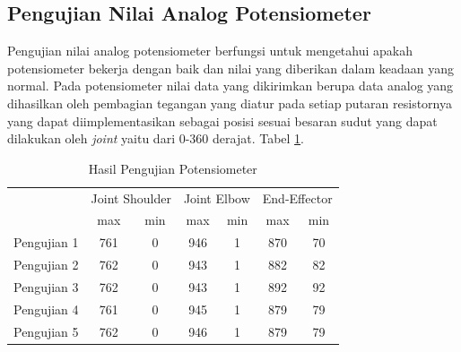 \subsection{Pengujian Nilai Analog Potensiometer}
Pengujian nilai analog potensiometer berfungsi untuk mengetahui apakah potensiometer bekerja dengan baik dan nilai yang diberikan dalam keadaan yang normal. Pada potensiometer nilai data yang dikirimkan berupa data analog yang dihasilkan oleh pembagian tegangan yang diatur pada setiap putaran resistornya yang dapat diimplementasikan sebagai posisi sesuai besaran sudut yang dapat dilakukan oleh \textit{joint} yaitu dari 0-360 derajat. Tabel \ref{tbl.potensiometer}.

\begin{table}[H]
	\centering
	\caption{Hasil Pengujian Potensiometer}
	\label{tbl.potensiometer}
	\begin{tabular}{|c|c|c|c|c|c|c|}
		\hline
		\rowcolor[HTML]{9B9B9B} 
		\cellcolor[HTML]{9B9B9B}                            & \multicolumn{2}{c|}{\cellcolor[HTML]{9B9B9B}Joint Shoulder} & \multicolumn{2}{c|}{\cellcolor[HTML]{9B9B9B}Joint Elbow} & \multicolumn{2}{c|}{\cellcolor[HTML]{9B9B9B}End-Effector} \\ \cline{2-7} 
		\rowcolor[HTML]{9B9B9B} 
		\multirow{-2}{*}{\cellcolor[HTML]{9B9B9B}Pengujian} & max                          & min                          & max                         & min                        & max                         & min                         \\ \hline
		Pengujian 1                                         & 761                          & 0                            & 946                         & 1                          & 870                         & 70                          \\ \hline
		Pengujian 2                                         & 762                          & 0                            & 943                         & 1                          & 882                         & 82                          \\ \hline
		Pengujian 3                                         & 762                          & 0                            & 943                         & 1                          & 892                         & 92                          \\ \hline
		Pengujian 4                                         & 761                          & 0                            & 945                         & 1                          & 879                         & 79                          \\ \hline
		Pengujian 5                                         & 762                          & 0                            & 946                         & 1                          & 879                         & 79                          \\ \hline
	\end{tabular}
\end{table} 



